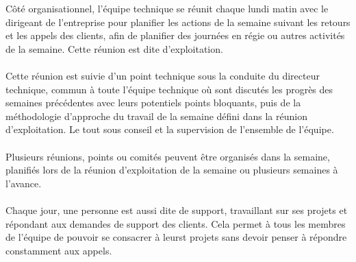 Côté organisationnel, l'équipe technique se réunit chaque lundi matin avec le dirigeant de l'entreprise pour planifier les actions de la semaine suivant les retours et les appels des clients, afin de planifier des journées en régie ou autres activités de la semaine. Cette réunion est dite d'exploitation.
\\ \\
Cette réunion est suivie d'un point technique sous la conduite du directeur technique, commun à toute l'équipe technique où sont discutés les progrès des semaines précédentes avec leurs potentiels points bloquants, puis de la méthodologie d'approche du travail de la semaine défini dans la réunion d'exploitation. Le tout sous conseil et la supervision de l'ensemble de l'équipe.
\\ \\
Plusieurs réunions, points ou comités peuvent être organisés dans la semaine, planifiés lors de la réunion d'exploitation de la semaine ou plusieurs semaines à l'avance.
\\ \\
Chaque jour, une personne est aussi dite de support, travaillant sur ses projets et répondant aux demandes de support des clients. Cela permet à tous les membres de l'équipe de pouvoir se consacrer à leurst projets sans devoir penser à répondre constamment aux appels.

\newpage